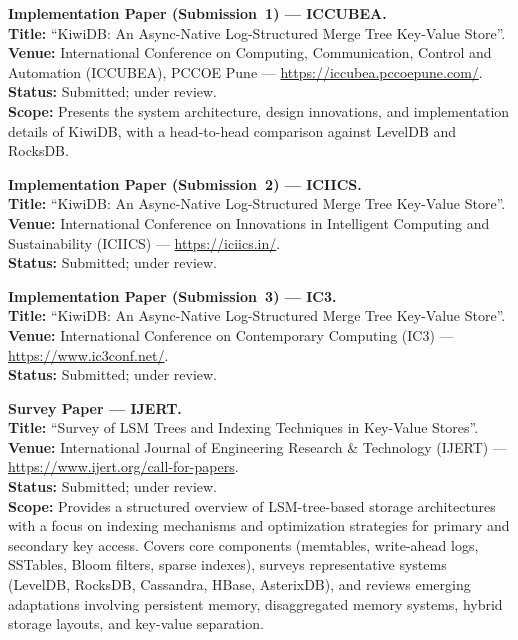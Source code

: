\documentclass[oneside,a4paper,12pt]{book}
\begin{document}
\vspace{0.5em}
\noindent\textbf{Implementation Paper (Submission~1) --- ICCUBEA.}\\
\textbf{Title:} ``KiwiDB: An Async-Native Log-Structured Merge Tree Key-Value Store''.\\
\textbf{Venue:} International Conference on Computing, Communication, Control and Automation (ICCUBEA), PCCOE Pune --- \url{https://iccubea.pccoepune.com/}.\\
\textbf{Status:} Submitted; under review.\\
\textbf{Scope:} Presents the system architecture, design innovations, and implementation details of KiwiDB, with a head-to-head comparison against LevelDB and RocksDB.

\vspace{0.5em}
\noindent\textbf{Implementation Paper (Submission~2) --- ICIICS.}\\
\textbf{Title:} ``KiwiDB: An Async-Native Log-Structured Merge Tree Key-Value Store''.\\
\textbf{Venue:} International Conference on Innovations in Intelligent Computing and Sustainability (ICIICS) --- \url{https://iciics.in/}.\\
\textbf{Status:} Submitted; under review.

\vspace{0.5em}
\noindent\textbf{Implementation Paper (Submission~3) --- IC3.}\\
\textbf{Title:} ``KiwiDB: An Async-Native Log-Structured Merge Tree Key-Value Store''.\\
\textbf{Venue:} International Conference on Contemporary Computing (IC3) --- \url{https://www.ic3conf.net/}.\\
\textbf{Status:} Submitted; under review.

\vspace{0.5em}
\noindent\textbf{Survey Paper --- IJERT.}\\
\textbf{Title:} ``Survey of LSM Trees and Indexing Techniques in Key-Value Stores''.\\
\textbf{Venue:} International Journal of Engineering Research \& Technology (IJERT) --- \url{https://www.ijert.org/call-for-papers}.\\
\textbf{Status:} Submitted; under review.\\
\textbf{Scope:} Provides a structured overview of LSM-tree-based storage architectures with a focus on indexing mechanisms and optimization strategies for primary and secondary key access. Covers core components (memtables, write-ahead logs, SSTables, Bloom filters, sparse indexes), surveys representative systems (LevelDB, RocksDB, Cassandra, HBase, AsterixDB), and reviews emerging adaptations involving persistent memory, disaggregated memory systems, hybrid storage layouts, and key-value separation.
\end{document}
